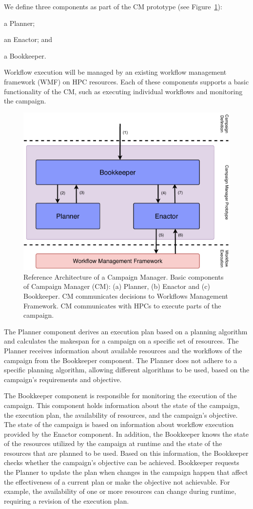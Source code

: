 We define three components as part of the CM prototype (see 
Figure~\ref{fig:refarch}):
\begin{inparaenum}[(1)]
    \item a Planner;
    \item an Enactor; and
    \item a Bookkeeper.
\end{inparaenum}
Workflow execution will be managed by an existing workflow management framework
(WMF) on HPC resources. Each of these components supports a basic functionality
of the CM, such as executing individual workflows and monitoring
the campaign.

\begin{figure}[t]
    \centering
    \includegraphics[width=.75\textwidth]{figures/manager/CEM_design.pdf}
    \caption{Reference Architecture of a Campaign Manager. Basic components of
        Campaign Manager (CM): (a) Planner, (b) Enactor and (c) Bookkeeper. CM
        communicates decisions to Workflows Management Framework. CM
        communicates with HPCs to execute parts of the
        campaign.}\label{fig:refarch}
\end{figure}

The Planner component derives an execution plan based on a planning algorithm
and calculates the makespan for a campaign on a specific set of resources. The
Planner receives information about available resources and the workflows of the
campaign from the Bookkeeper component. The Planner does not adhere to a
specific planning algorithm, allowing different algorithms to be used, based on
the campaign's requirements and objective.

The Bookkeeper component is responsible for monitoring the execution of the
campaign. This component holds information about the state of the campaign, the
execution plan, the availability of resources, and the campaign's objective. The
state of the campaign is based on information about workflow execution provided
by the Enactor component. In addition, the Bookkeeper knows the state of the
resources utilized by the campaign at runtime and the state of the resources
that are planned to be used. Based on this information, the Bookkeeper checks
whether the campaign's objective can be achieved. Bookkeeper requests the
Planner to update the plan when changes in the campaign happen that
affect the effectiveness of a current plan or make the objective not achievable.
For example, the availability of one or more resources can change during
runtime, requiring a revision of the execution plan.

